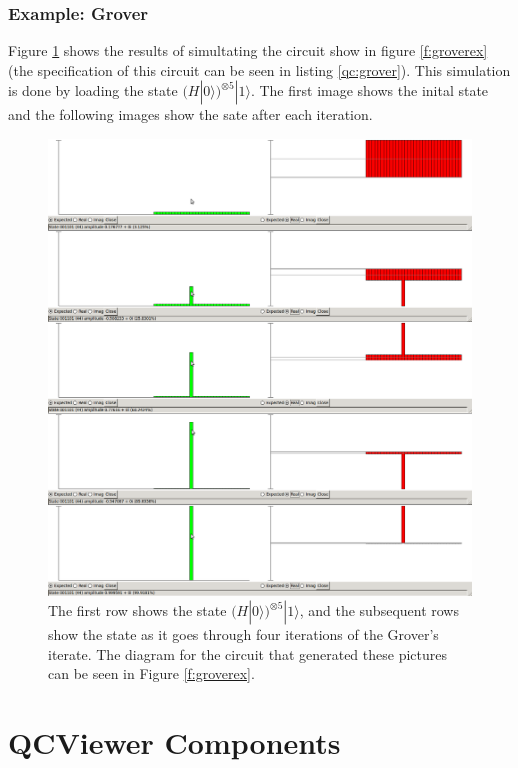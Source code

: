 \documentclass[10pt]{article}
\theoremstyle{definition}
\begin{document}
\subsubsection{Example: Grover}

Figure \ref{f:simulate} shows the results of simultating the circuit show in figure \ref{f:groverex} 
(the specification of this circuit can be seen in listing \ref{qc:grover}).  This simulation is done by loading
the state $(H|0\rangle)^{\otimes 5}|1\rangle$.  The first image shows the inital state and the following images 
show the sate after each iteration.

\begin{figure}
\capstart
\centering
\includegraphics[scale=.35]{Figures/simulate}
\caption{The first row shows the state $(H|0\rangle)^{\otimes 5}|1\rangle$, 
and the subsequent rows show the state as it goes through four iterations of the Grover's iterate. The
diagram for the circuit that generated these pictures can be seen in Figure \ref{f:groverex}.}
\label{f:simulate}
\end{figure}

\section{QCViewer Components}\label{sec:QCViewerComponents}
\end{document}
